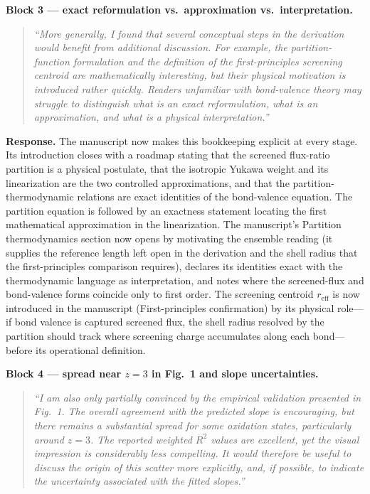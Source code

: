 \documentclass[11pt]{article}
\newenvironment{refquote}%
  {\begin{quote}\itshape\color{black!70}}%
  {\end{quote}}
\begin{document}
\textbf{Block 3 --- exact reformulation vs.\ approximation vs.\
interpretation.}

\begin{refquote}
``More generally, I found that several conceptual steps in the
derivation would benefit from additional discussion.  For example, the
partition-function formulation and the definition of the
first-principles screening centroid are mathematically interesting,
but their physical motivation is introduced rather quickly.  Readers
unfamiliar with bond-valence theory may struggle to distinguish what
is an exact reformulation, what is an approximation, and what is a
physical interpretation.''
\end{refquote}

\textbf{Response.}  The manuscript now makes this bookkeeping explicit
at every stage.  Its introduction closes with a roadmap stating that
the screened flux-ratio partition is a physical postulate, that the
isotropic Yukawa weight and its linearization are the two controlled
approximations, and that the partition-thermodynamic relations are
exact identities of the bond-valence equation.  The partition equation
is followed by an exactness statement locating the first mathematical
approximation in the linearization.  The manuscript's Partition
thermodynamics section now opens by motivating the ensemble reading
(it supplies the reference length left open in the derivation and the
shell radius that the first-principles comparison requires), declares
its identities exact with the thermodynamic language as
interpretation, and notes where the screened-flux and bond-valence
forms coincide only to first order.  The screening centroid
$r_{\mathrm{eff}}$ is now introduced in the manuscript
(First-principles confirmation) by its physical role---if bond valence
is captured screened flux, the shell radius resolved by the partition
should track where screening charge accumulates along each bond---%
before its operational definition.

\textbf{Block 4 --- spread near $z=3$ in Fig.~1 and slope
uncertainties.}

\begin{refquote}
``I am also only partially convinced by the empirical validation
presented in Fig.~1.  The overall agreement with the predicted slope
is encouraging, but there remains a substantial spread for some
oxidation states, particularly around $z=3$.  The reported weighted
$R^2$ values are excellent, yet the visual impression is considerably
less compelling.  It would therefore be useful to discuss the origin
of this scatter more explicitly, and, if possible, to indicate the
uncertainty associated with the fitted slopes.''
\end{refquote}
\end{document}
